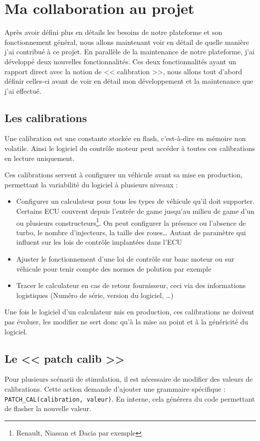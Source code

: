 \chapter{Ma collaboration au projet}\label{collab}
\putminitoc
Après avoir défini plus en détails les besoins de notre plateforme et son fonctionnement général, nous allons maintenant voir en détail de quelle manière j'ai contribué à ce projet. En parallèle de la maintenance de notre plateforme, j'ai développé deux nouvelles fonctionnalités. Ces deux fonctionnalités ayant un rapport direct avec la notion de << calibration >>, nous allons tout d'abord définir celles-ci avant de voir en détail mon développement et la maintenance que j'ai effectué.

\section{Les calibrations}
Une calibration est une constante stockée en flash, c'est-à-dire en mémoire non volatile. Ainsi le logiciel du contrôle moteur peut accéder à toutes ces calibrations en lecture uniquement.

Ces calibrations servent à configurer un véhicule avant sa mise en production, permettant la variabilité du logiciel à plusieurs niveaux : 
\begin{itemize}
	\item Configurer un calculateur pour tous les types de véhicule qu'il doit supporter. Certains ECU couvrent depuis l'entrée de game jusqu'au milieu de game d'un ou plusieurs constructeurs\footnote{Renault, Niassan et Dacia par exemple}. On peut configurer la présence ou l'absence de turbo, le nombre d'injecteurs, la taille des roues\ldots\newline
	 Autant de paramètre qui influent sur les lois de contrôle implantées dans l'ECU
	\item Ajuster le fonctionnement d'une loi de contrôle sur banc moteur ou sur véhicule pour tenir compte des normes de polution par exemple
	\item Tracer le calculateur en cas de retour fournisseur, ceci via des informations logistiques (Numéro de série, version du logiciel, \ldots)
\end{itemize}

Une fois le logiciel d'un calculateur mis en production, ces calibrations ne doivent pas évoluer, les modifier ne sert donc qu'à la mise au point et à la généricité du logiciel.
\vfill
\section{Le << patch calib >>}\label{patch}
Pour plusieurs scénarii de stimulation, il est nécessaire de modifier des valeurs de calibrations. Cette action demande d'ajouter une grammaire spécifique : \texttt{PATCH\_CAL(calibration, valeur)}. En interne, cela générera du code permettant de flasher la nouvelle valeur.
%
